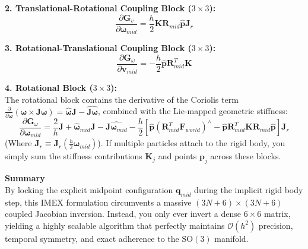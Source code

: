 \textbf{2. Translational-Rotational Coupling Block ($3 \times 3$):}
\begin{equation}
    \frac{\partial \mathbf{G}_v}{\partial \boldsymbol{\omega}_{mid}} = \frac{h}{2} \mathbf{K} \mathbf{R}_{mid} \widehat{\mathbf{p}} \mathbf{J}_r
\end{equation}

\textbf{3. Rotational-Translational Coupling Block ($3 \times 3$):}
\begin{equation}
    \frac{\partial \mathbf{G}_\omega}{\partial \mathbf{v}_{mid}} = -\frac{h}{2} \widehat{\mathbf{p}} \mathbf{R}_{mid}^T \mathbf{K}
\end{equation}

\textbf{4. Rotational Block ($3 \times 3$):}\\
The rotational block contains the derivative of the Coriolis term $\frac{\partial}{\partial \boldsymbol{\omega}} (\boldsymbol{\omega} \times \mathbf{J}\boldsymbol{\omega}) = \widehat{\boldsymbol{\omega}}\mathbf{J} - \widehat{\mathbf{J}\boldsymbol{\omega}}$, combined with the Lie-mapped geometric stiffness:
\begin{equation}
    \frac{\partial \mathbf{G}_\omega}{\partial \boldsymbol{\omega}_{mid}} = \frac{2}{h} \mathbf{J} + \widehat{\boldsymbol{\omega}}_{mid} \mathbf{J} - \widehat{\mathbf{J} \boldsymbol{\omega}_{mid}} - \frac{h}{2} \left[ \widehat{\mathbf{p}} \left( \mathbf{R}_{mid}^T \mathbf{F}_{world} \right)^\wedge - \widehat{\mathbf{p}} \mathbf{R}_{mid}^T \mathbf{K} \mathbf{R}_{mid} \widehat{\mathbf{p}} \right] \mathbf{J}_r
\end{equation}
(Where $\mathbf{J}_r \equiv \mathbf{J}_r(\frac{h}{2}\boldsymbol{\omega}_{mid})$). If multiple particles attach to the rigid body, you simply sum the stiffness contributions $\mathbf{K}_j$ and points $\mathbf{p}_j$ across these blocks.

\textbf{Summary}\\
By locking the explicit midpoint configuration $\mathbf{q}_{mid}$ during the implicit rigid body step, this IMEX formulation circumvents a massive $(3N+6) \times (3N+6)$ coupled Jacobian inversion. Instead, you only ever invert a dense $6 \times 6$ matrix, yielding a highly scalable algorithm that perfectly maintains $\mathcal{O}(h^2)$ precision, temporal symmetry, and exact adherence to the $\text{SO}(3)$ manifold.